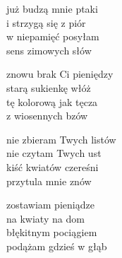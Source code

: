 \begin{text}
    już budzą mnie ptaki\\
    i strzygą się z piór\\
    w niepamięć posyłam\\
    sens zimowych słów

    znowu brak Ci pieniędzy\\
    starą sukienkę włóż\\
    tę kolorową jak tęcza\\
    z wiosennych bzów

    nie zbieram Twych listów\\
    nie czytam Twych ust\\
    kiść kwiatów czereśni\\
    przytula mnie znów

    zostawiam pieniądze\\
    na kwiaty na dom\\
    błękitnym pociągiem\\
    podążam gdzieś w głąb
\end{text}
\begin{chord}

\end{chord}